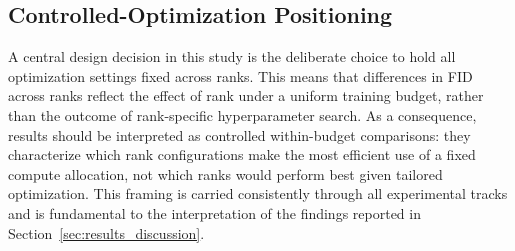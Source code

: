 \subsection{Controlled-Optimization Positioning}

A central design decision in this study is the deliberate choice to hold all optimization settings fixed across ranks. This means that differences in FID across ranks reflect the effect of rank under a uniform training budget, rather than the outcome of rank-specific hyperparameter search. As a consequence, results should be interpreted as controlled within-budget comparisons: they characterize which rank configurations make the most efficient use of a fixed compute allocation, not which ranks would perform best given tailored optimization. This framing is carried consistently through all experimental tracks and is fundamental to the interpretation of the findings reported in Section~\ref{sec:results_discussion}.